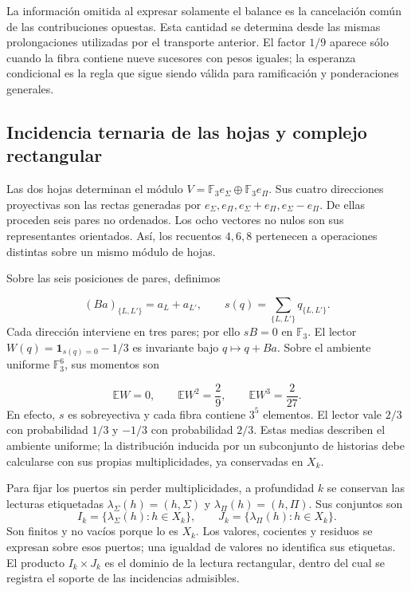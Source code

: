 La información omitida al expresar solamente el balance es la cancelación común de las contribuciones opuestas. Esta cantidad se determina desde las mismas prolongaciones utilizadas por el transporte anterior. El factor \(1/9\) aparece sólo cuando la fibra contiene nueve sucesores con pesos iguales; la esperanza condicional es la regla que sigue siendo válida para ramificación y ponderaciones generales.

\subsection{Incidencia ternaria de las hojas y complejo rectangular}
\label{iv:cont:incidencia-rectangular}
Las dos hojas determinan el módulo \(V=\mathbb F_3e_\Sigma\oplus\mathbb F_3e_\Pi\). Sus cuatro direcciones proyectivas son las rectas generadas por \(e_\Sigma,e_\Pi,e_\Sigma+e_\Pi,e_\Sigma-e_\Pi\). De ellas proceden seis pares no ordenados. Los ocho vectores no nulos son sus representantes orientados. Así, los recuentos \(4,6,8\) pertenecen a operaciones distintas sobre un mismo módulo de hojas.

Sobre las seis posiciones de pares, definimos

\[
(Ba)_{\{L,L'\}}=a_L+a_{L'},
\qquad
s(q)=\sum_{\{L,L'\}}q_{\{L,L'\}}.
\]
Cada dirección interviene en tres pares; por ello \(sB=0\) en \(\mathbb F_3\). El lector \(W(q)=\mathbf1_{s(q)=0}-1/3\) es invariante bajo \(q\mapsto q+Ba\). Sobre el ambiente uniforme \(\mathbb F_3^6\), sus momentos son

\[
\mathbb EW=0,\qquad
\mathbb EW^2=\frac29,\qquad
\mathbb EW^3=\frac2{27}.
\]
En efecto, \(s\) es sobreyectiva y cada fibra contiene \(3^5\) elementos. El lector vale \(2/3\) con probabilidad \(1/3\) y \(-1/3\) con probabilidad \(2/3\). Estas medias describen el ambiente uniforme; la distribución inducida por un subconjunto de historias debe calcularse con sus propias multiplicidades, ya conservadas en \(X_k\).

Para fijar los puertos sin perder multiplicidades, a profundidad \(k\) se conservan las lecturas etiquetadas \(\lambda_\Sigma(h)=(h,\Sigma)\) y \(\lambda_\Pi(h)=(h,\Pi)\). Sus conjuntos son
\[
I_k=\{\lambda_\Sigma(h):h\in X_k\},\qquad
J_k=\{\lambda_\Pi(h):h\in X_k\}.
\]
Son finitos y no vacíos porque lo es \(X_k\). Los valores, cocientes y residuos se expresan sobre esos puertos; una igualdad de valores no identifica sus etiquetas. El producto \(I_k\times J_k\) es el dominio de la lectura rectangular, dentro del cual se registra el soporte de las incidencias admisibles.

